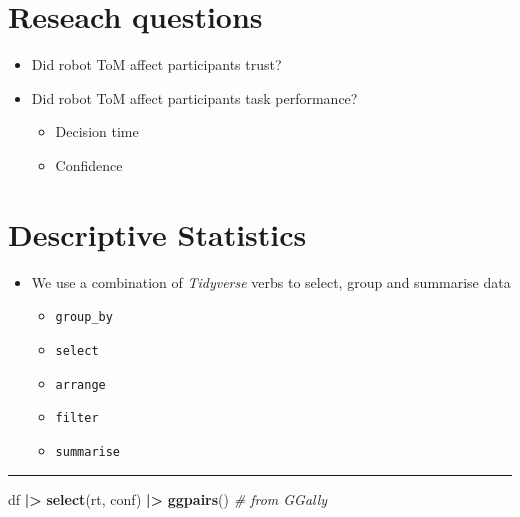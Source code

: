 \documentclass[
]{article}
\newenvironment{Shaded}{\begin{snugshade}}{\end{snugshade}}
\newcommand{\CommentTok}[1]{\textcolor[rgb]{0.56,0.35,0.01}{\textit{#1}}}
\newcommand{\FunctionTok}[1]{\textcolor[rgb]{0.13,0.29,0.53}{\textbf{#1}}}
\newcommand{\NormalTok}[1]{#1}
\newcommand{\SpecialCharTok}[1]{\textcolor[rgb]{0.81,0.36,0.00}{\textbf{#1}}}
\providecommand{\tightlist}{%
  \setlength{\itemsep}{0pt}\setlength{\parskip}{0pt}}
\begin{document}
\hypertarget{reseach-questions}{%
\section{Reseach questions}\label{reseach-questions}}

\begin{itemize}
\tightlist
\item
  Did robot ToM affect participants trust?
\item
  Did robot ToM affect participants task performance?

  \begin{itemize}
  \tightlist
  \item
    Decision time
  \item
    Confidence
  \end{itemize}
\end{itemize}

\hypertarget{descriptive-statistics}{%
\section{Descriptive Statistics}\label{descriptive-statistics}}

\begin{itemize}
\tightlist
\item
  We use a combination of \emph{Tidyverse} verbs to select, group and
  summarise data

  \begin{itemize}
  \tightlist
  \item
    \texttt{group\_by}
  \item
    \texttt{select}
  \item
    \texttt{arrange}
  \item
    \texttt{filter}
  \item
    \texttt{summarise}
  \end{itemize}
\end{itemize}

\begin{center}\rule{0.5\linewidth}{0.5pt}\end{center}

\begin{Shaded}
\begin{Highlighting}[]
\NormalTok{df }\SpecialCharTok{|\textgreater{}}
  \FunctionTok{select}\NormalTok{(rt,}
\NormalTok{         conf) }\SpecialCharTok{|\textgreater{}}
  \FunctionTok{ggpairs}\NormalTok{() }\CommentTok{\# from GGally}
\end{Highlighting}
\end{Shaded}
\end{document}
